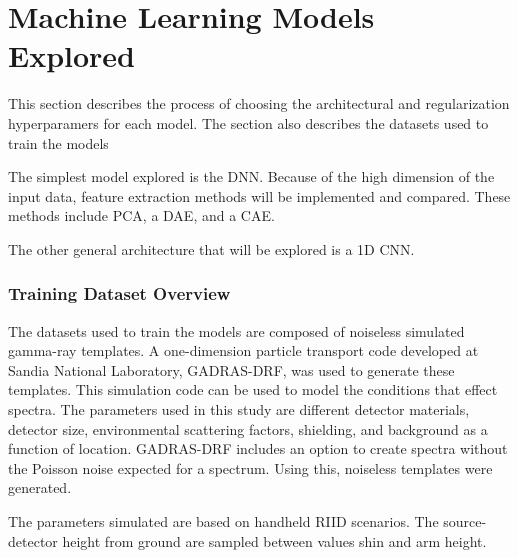 \chapter{Machine Learning Models Explored}

This section describes the process of choosing the architectural and regularization hyperparamers for each model. The section also describes the datasets used to train the models 

The simplest model explored is the DNN. Because of the high dimension of the input data, feature extraction methods will be implemented and compared. These methods include PCA, a DAE, and a CAE. 

The other general architecture that will be explored is a 1D CNN. 

\subsection{Training Dataset Overview}

The datasets used to train the models are composed of noiseless simulated gamma-ray templates. A one-dimension particle transport code developed at Sandia National Laboratory, GADRAS-DRF, was used to generate these templates. This simulation code can be used to model the conditions that effect spectra. The parameters used in this study are different detector materials, detector size, environmental scattering factors, shielding, and background as a function of location. GADRAS-DRF includes an option to create spectra without the Poisson noise expected for a spectrum. Using this, noiseless templates were generated.

The parameters simulated are based on handheld RIID scenarios. The source-detector height from ground are sampled between values shin and arm height. 


